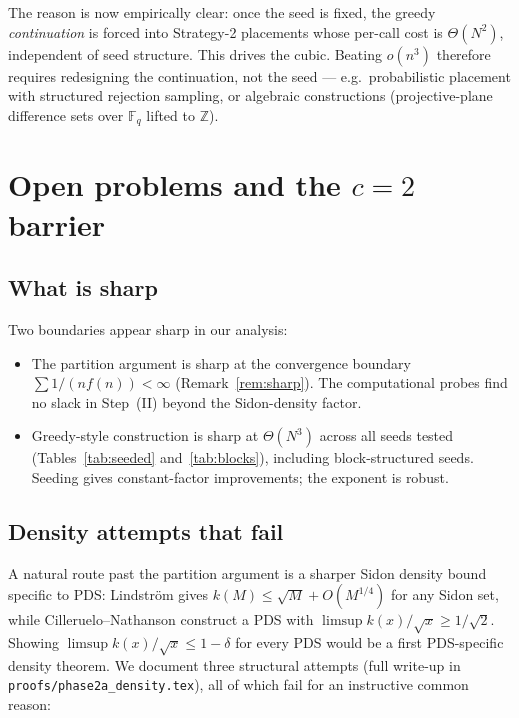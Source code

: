 \documentclass[11pt]{article}
\begin{document}
The reason is now empirically clear: once the seed is fixed, the greedy
\emph{continuation} is forced into Strategy-2 placements whose per-call
cost is $\Theta(N^2)$, independent of seed structure. This drives the
cubic. Beating $o(n^3)$ therefore requires redesigning the
continuation, not the seed --- e.g.\ probabilistic placement with
structured rejection sampling, or algebraic constructions
(projective-plane difference sets over $\mathbb{F}_{q}$ lifted to
$\mathbb{Z}$).

\section{Open problems and the $c = 2$ barrier}\label{sec:open}

\subsection{What is sharp}

Two boundaries appear sharp in our analysis:

\begin{itemize}
\item The partition argument is sharp at the convergence boundary
      $\sum 1/(nf(n)) < \infty$ (Remark~\ref{rem:sharp}). The
      computational probes find no slack in Step~(II) beyond the
      Sidon-density factor.

\item Greedy-style construction is sharp at $\Theta(N^3)$ across all
      seeds tested (Tables~\ref{tab:seeded} and~\ref{tab:blocks}),
      including block-structured seeds. Seeding gives constant-factor
      improvements; the exponent is robust.
\end{itemize}

\subsection{Density attempts that fail}\label{sec:density-fails}

A natural route past the partition argument is a sharper Sidon density
bound specific to PDS: Lindstr\"om gives $k(M) \leq \sqrt M + O(M^{1/4})$
for any Sidon set, while Cilleruelo--Nathanson \cite{CiNa08} construct a
PDS with $\limsup k(x)/\sqrt x \geq 1/\sqrt 2$. Showing
$\limsup k(x)/\sqrt x \leq 1 - \delta$ for every PDS would be a first
PDS-specific density theorem. We document three structural attempts
(full write-up in \texttt{proofs/phase2a\_density.tex}), all of which
fail for an instructive common reason:
\end{document}
